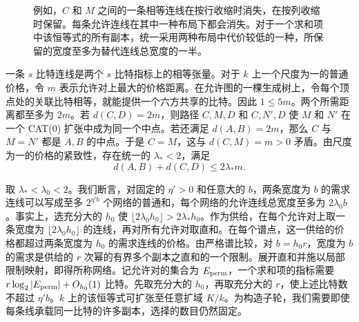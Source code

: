 \begin{figure}[htb]\centering {} \caption{例如，\(C\) 和 \(M\) 之间的一条相等连线在按行收缩时消失，在按列收缩时保留。每条允许连线在其中一种布局下都会消失。对于一个求和项中该恒等式的所有副本，统一采用两种布局中代价较低的一种，所保留的宽度至多为替代连线总宽度的一半。}\label{fig:two-layouts} \end{figure}

一条 \(s\) 比特连线是两个 \(s\) 比特指标上的相等张量。对于 \(k\) 上一个尺度为一的普通价格，令 \(m\) 表示允许对上最大的价格距离。在允许图的一棵生成树上，令每个顶点处的关联比特相等，就能提供一个六方共享的比特。因此 \(1\le5m\)。两个所需距离都至多为 \(2m\)。若 \(d(C,D)=2m\)，则路径 \(C,M,D\) 和 \(C,N',D\) 使 \(M\) 和 \(N'\) 在一个 CAT(0) 扩张中成为同一个中点。若还满足 \(d(A,B)=2m\)，那么 \(C\) 与 \(M=N'\) 都是 \(A,B\) 的中点。于是 \(C=M\)，这与 \(d(C,M)=m>0\) 矛盾。由尺度为一的价格的紧致性，存在统一的 \(\lambda_*<2\)，满足 \[
 d(A,B)+d(C,D)\le2\lambda_*m .
\]

取 \(\lambda_*<\lambda_0<2\)。我们断言，对固定的 \(\eta'>0\) 和任意大的 \(b\)，两条宽度为 \(b\) 的需求连线可以写成至多 \(2^{\eta'b}\) 个网络的普通和，每个网络的允许连线总宽度至多为 \(2\lambda_0b\)。事实上，选充分大的 \(h_0\) 使 \(\lfloor2\lambda_0h_0\rfloor>2\lambda_*h_0\)。作为供给，在每个允许对上取一条宽度为 \(\lfloor2\lambda_0h_0\rfloor\) 的连线，再对所有允许对取直和。在每个谱点，这一供给的价格都超过两条宽度为 \(h_0\) 的需求连线的价格。由严格谱比较，对 \(b=h_0r\)，宽度为 \(b\) 的需求是供给的 \(r\) 次幂的有界多个副本之直和的一个限制。展开直和并施以局部限制映射，即得所称网络。记允许对的集合为 \(E_{\rm perm}\)，一个求和项的指标需要 \(r\log_2|E_{\rm perm}|+O_{h_0}(1)\) 比特。先取充分大的 \(h_0\)，再取充分大的 \(r\)，使上述比特数不超过 \(\eta'b\)。\(k\) 上的该恒等式可扩张至任意扩域 \(K/k\)。为构造子轮，我们需要即使每条线承载同一比特的许多副本，选择的数目仍然固定。

